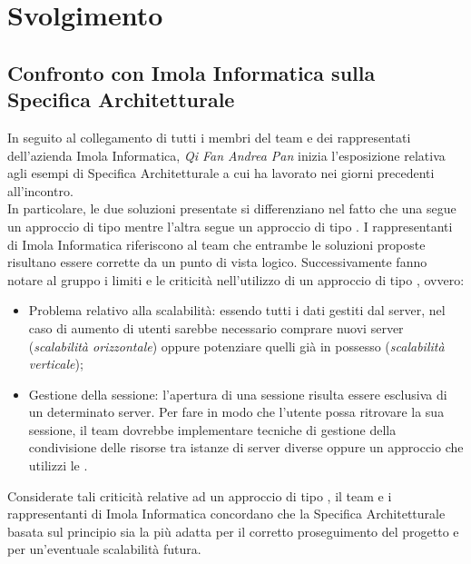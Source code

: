 \section{Svolgimento}

\subsection{Confronto con Imola Informatica sulla Specifica Architetturale} 
In seguito al collegamento di tutti i membri del team e dei rappresentati dell'azienda Imola Informatica, \textit{Qi Fan Andrea Pan} inizia l'esposizione relativa agli esempi di Specifica Architetturale a cui ha lavorato nei giorni precedenti all'incontro. \\
In particolare, le due soluzioni presentate si differenziano nel fatto che una segue un approccio di tipo  mentre l'altra segue un approccio di tipo . \newline
I rappresentanti di Imola Informatica riferiscono al team che entrambe le soluzioni proposte risultano essere corrette da un punto di vista logico. Successivamente fanno notare al gruppo i limiti e le criticità nell'utilizzo di un approccio di tipo , ovvero: 
\begin{itemize}
    \item Problema relativo alla scalabilità: essendo tutti i dati gestiti dal server, nel caso di aumento di utenti sarebbe necessario comprare nuovi server (\textit{scalabilità orizzontale}) oppure potenziare quelli già in possesso (\textit{scalabilità verticale});
    \item Gestione della sessione: l'apertura di una sessione risulta essere esclusiva di un determinato server. Per fare in modo che l'utente possa ritrovare la sua sessione, il team dovrebbe implementare tecniche di gestione della condivisione delle risorse tra istanze di server diverse oppure un approccio che utilizzi le .
\end{itemize}
Considerate tali criticità relative ad un approccio di tipo , il team e i rappresentanti di Imola Informatica concordano che la Specifica Architetturale basata sul principio  sia la più adatta per il corretto proseguimento del progetto e per un'eventuale scalabilità futura. 

